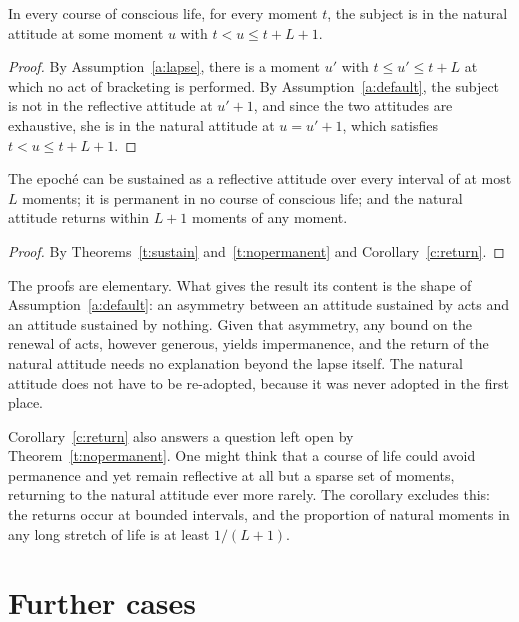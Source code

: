 \documentclass{situationist-preprint}
\begin{document}
\begin{corollary}\label{c:return}
In every course of conscious life, for every moment $t$, the subject is in the natural attitude at some moment $u$ with $t < u \le t + L + 1$.
\end{corollary}

\begin{proof}
By Assumption~\ref{a:lapse}, there is a moment $u'$ with $t \le u' \le t + L$ at which no act of bracketing is performed. By Assumption~\ref{a:default}, the subject is not in the reflective attitude at $u'+1$, and since the two attitudes are exhaustive, she is in the natural attitude at $u = u'+1$, which satisfies $t < u \le t+L+1$.
\end{proof}

\begin{theorem}\label{t:main}
The epoché can be sustained as a reflective attitude over every interval of at most $L$ moments; it is permanent in no course of conscious life; and the natural attitude returns within $L+1$ moments of any moment.
\end{theorem}

\begin{proof}
By Theorems~\ref{t:sustain} and~\ref{t:nopermanent} and Corollary~\ref{c:return}.
\end{proof}

The proofs are elementary. What gives the result its content is the shape of Assumption~\ref{a:default}: an asymmetry between an attitude sustained by acts and an attitude sustained by nothing. Given that asymmetry, any bound on the renewal of acts, however generous, yields impermanence, and the return of the natural attitude needs no explanation beyond the lapse itself. The natural attitude does not have to be re-adopted, because it was never adopted in the first place.

Corollary~\ref{c:return} also answers a question left open by Theorem~\ref{t:nopermanent}. One might think that a course of life could avoid permanence and yet remain reflective at all but a sparse set of moments, returning to the natural attitude ever more rarely. The corollary excludes this: the returns occur at bounded intervals, and the proportion of natural moments in any long stretch of life is at least $1/(L+1)$.

\section{Further cases}\label{s:cases}
\end{document}
